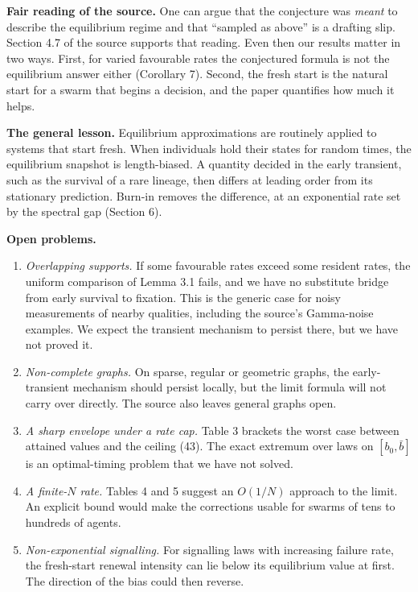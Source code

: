 \documentclass[
  british,
  11pt,
  a4paper,
]{article}
\providecommand{\tightlist}{%
  \setlength{\itemsep}{0pt}\setlength{\parskip}{0pt}}
\begin{document}
\textbf{Fair reading of the source.} One can argue that the conjecture
was \emph{meant} to describe the equilibrium regime and that ``sampled
as above'' is a drafting slip. Section 4.7 of the source supports that
reading. Even then our results matter in two ways. First, for varied
favourable rates the conjectured formula is not the equilibrium answer
either (Corollary 7). Second, the fresh start is the natural start for a
swarm that begins a decision, and the paper quantifies how much it
helps.

\textbf{The general lesson.} Equilibrium approximations are routinely
applied to systems that start fresh. When individuals hold their states
for random times, the equilibrium snapshot is length-biased. A quantity
decided in the early transient, such as the survival of a rare lineage,
then differs at leading order from its stationary prediction. Burn-in
removes the difference, at an exponential rate set by the spectral gap
(Section 6).

\textbf{Open problems.}

\begin{enumerate}
\def\labelenumi{\arabic{enumi}.}
\tightlist
\item
  \emph{Overlapping supports.} If some favourable rates exceed some
  resident rates, the uniform comparison of Lemma 3.1 fails, and we have
  no substitute bridge from early survival to fixation. This is the
  generic case for noisy measurements of nearby qualities, including the
  source's Gamma-noise examples. We expect the transient mechanism to
  persist there, but we have not proved it.
\item
  \emph{Non-complete graphs.} On sparse, regular or geometric graphs,
  the early-transient mechanism should persist locally, but the limit
  formula will not carry over directly. The source also leaves general
  graphs open.
\item
  \emph{A sharp envelope under a rate cap.} Table 3 brackets the worst
  case between attained values and the ceiling (43). The exact extremum
  over laws on \([b_0,\bar b]\) is an optimal-timing problem that we
  have not solved.
\item
  \emph{A finite-\(N\) rate.} Tables 4 and 5 suggest an \(O(1/N)\)
  approach to the limit. An explicit bound would make the corrections
  usable for swarms of tens to hundreds of agents.
\item
  \emph{Non-exponential signalling.} For signalling laws with increasing
  failure rate, the fresh-start renewal intensity can lie below its
  equilibrium value at first. The direction of the bias could then
  reverse.
\end{enumerate}
\end{document}
